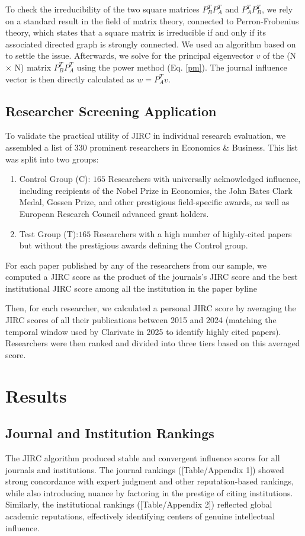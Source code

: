 \documentclass[10pt]{article}
\begin{document}
To check the irreducibility of the two square matrices \(P_B^T P_A^T\) and \(P_A^T P_B^T\), we rely on a standard result in the field of matrix theory, connected to Perron-Frobenius theory, which states that a square matrix is irreducible if and only if its associated directed graph is strongly connected. We  used an algorithm based on \cite{Dijkstra} to settle the issue. Afterwards,
we solve for the principal eigenvector $v$ of the (N × N) matrix \(P_B^T P_A^T\) using the power method (Eq. \ref{pm}). The journal influence vector is then directly calculated as \(w = P_A^T v\).

\subsection{Researcher Screening Application}
To validate the practical utility of JIRC in individual research evaluation, we assembled a list of  330 prominent researchers in Economics \& Business. This list was split into two groups:
\begin{enumerate}
  \item Control Group (C): $165$ Researchers with universally acknowledged influence, including recipients of the Nobel Prize in Economics, the John Bates Clark Medal, Gossen Prize, and other prestigious field-specific awards, as well as European Research Council advanced grant holders.
  \item Test Group (T):$165$ Researchers with a high number of highly-cited papers but without the prestigious awards defining the Control group.
\end{enumerate}
For each paper published by any of the researchers from our sample, we computed a JIRC score as the product of the journals's JIRC score and the best institutional JIRC score among all the institution in the paper byline

Then, for each researcher, we calculated a personal JIRC score by averaging the JIRC scores of all their publications between 2015 and 2024 (matching the  temporal window used by Clarivate in 2025 to identify highly cited papers). Researchers were then ranked and divided into three tiers based on this averaged score.

\section{Results}
\subsection{Journal and Institution Rankings}
The JIRC algorithm produced stable and convergent influence scores for all journals and institutions. The journal rankings ([Table/Appendix 1]) showed strong concordance with expert judgment and other reputation-based rankings, while also introducing nuance by factoring in the prestige of citing institutions. Similarly, the institutional rankings ([Table/Appendix 2]) reflected global academic reputations, effectively identifying centers of genuine intellectual influence.
\end{document}
